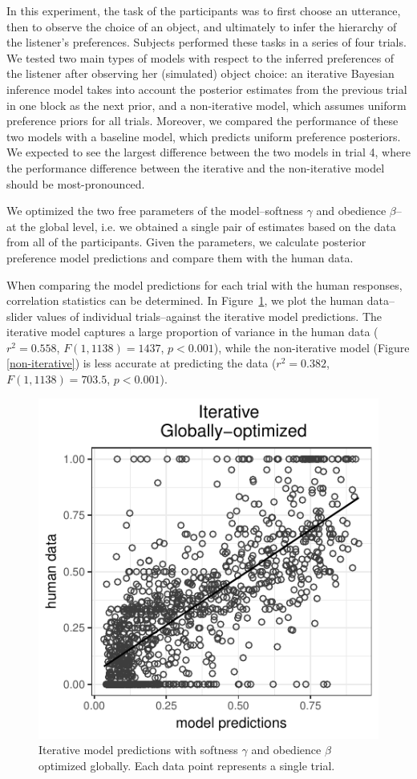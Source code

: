 \documentclass[10pt,a4paper]{article}
\begin{document}
In this experiment, the task of the participants was to first choose an utterance, then to observe the choice of an object, and ultimately to infer the hierarchy of the listener's preferences. Subjects performed these tasks in a series of four trials. We tested two main types of models with respect to the inferred preferences of the listener after observing her (simulated) object choice: an iterative Bayesian inference model takes into account the posterior estimates from the previous trial in one block as the next prior, and a non-iterative model, which assumes uniform preference priors for all trials.
Moreover, we compared the performance of these two models with a baseline model, which predicts uniform preference posteriors. 
We expected to see the largest difference between the two models in trial 4, where the performance difference between the iterative and the non-iterative model should be most-pronounced.


We optimized the two free parameters of the model--softness $\gamma$ and obedience $\beta$--at the global level, i.e. we obtained a single pair of estimates based on the data from all of the participants. 
Given the parameters, we calculate posterior preference model predictions and compare them with the human data. 

When comparing the model predictions for each trial with the human responses, correlation statistics can be determined. 
In Figure~\ref{iterative}, we plot the human data--slider values of individual trials--against the iterative model predictions. 
The iterative model captures a large proportion of variance in the human data  ($r^2=0.558$, $F(1,1138) = 1437$, $p<0.001$), while the non-iterative model (Figure \ref{non-iterative}) is less accurate at predicting the data  ($r^2=0.382$, $F(1,1138) = 703.5$, $p<0.001$).


\begin{figure}[t]
	\centering
	\includegraphics[width=.8\linewidth]{images/m4.pdf}
	\caption{Iterative model predictions with softness $\gamma$ and obedience $\beta$ optimized globally. Each data point represents a single trial.}	
	\label{iterative}
\end{figure}
\end{document}
